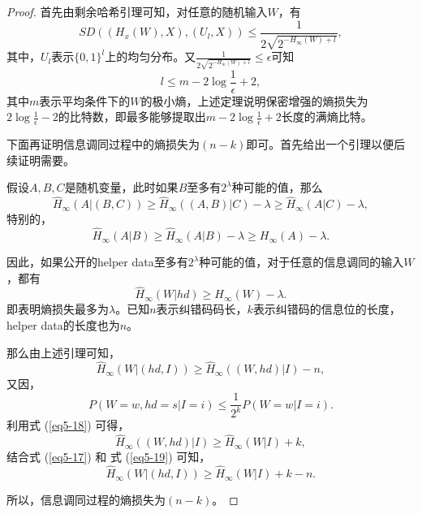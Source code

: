 \begin{proof}
	首先由剩余哈希引理可知，对任意的随机输入$W$，有
	\begin{equation}
		SD((H_x(W),X),(U_l,X)) \leq \frac{1}{2\sqrt{2^{-H_{\infty}(W)+l}}},
		\label{eq5-12}
	\end{equation}
	其中，$U_l$表示$\{0,1\}^l$上的均匀分布。又$\frac{1}{2\sqrt{2^{-H_{\infty}(W)+l}}} \leq \epsilon$可知
	\begin{equation}
		l\leq m-2\log\frac{1}{\epsilon}+2,
		\label{eq5-13}
	\end{equation}
	其中$m$表示平均条件下的$W$的极小熵，上述定理说明保密增强的熵损失为$2\log \frac{1}{\epsilon}-2$的比特数，即最多能够提取出$m-2\log \frac{1}{\epsilon}+2$长度的满熵比特。
	
	下面再证明信息调同过程中的熵损失为$(n-k)$即可。首先给出一个引理以便后续证明需要。
	\begin{lemma}
		假设$A,B,C$是随机变量，此时如果$B$至多有$2^{\lambda}$种可能的值，那么
		\begin{equation}
			\hat{H}_{\infty}(A|(B,C))\geq \hat{H}_{\infty}((A,B)|C)-\lambda \geq \hat{H}_{\infty}(A|C)-\lambda,
			\label{eq5-14}
		\end{equation}
		特别的，
		\begin{equation}
			\hat{H}_{\infty}(A|B)\geq \hat{H}_{\infty}(A|B)-\lambda \geq H_{\infty}(A)-\lambda.
			\label{eq5-15}
		\end{equation}
	\end{lemma}
	
	因此，如果公开的helper data至多有$2^{\lambda}$种可能的值，对于任意的信息调同的输入$W$，都有
	\begin{equation}
		\hat{H}_{\infty}(W|hd)\geq  H_{\infty}(W)-\lambda.
		\label{eq5-16}
	\end{equation}
	即表明熵损失最多为$\lambda$。已知$n$表示纠错码码长，$k$表示纠错码的信息位的长度，helper data的长度也为$n$。
	
	那么由上述引理可知，
	\begin{equation}
		\hat{H}_{\infty}(W|(hd,I))\geq \hat{H}_{\infty}((W,hd)|I)-n,
		\label{eq5-17}
	\end{equation}
	又因，
	\begin{equation}
		P(W=w,hd=s|I=i)\leq \frac{1}{2^{k}}P(W=w|I=i).
		\label{eq5-18}
	\end{equation}
	利用式 (\ref{eq5-18}) 可得，
	\begin{equation}
		\hat{H}_{\infty}((W,hd)|I) \geq \hat{H}_{\infty}(W|I)+k,
		\label{eq5-19}
	\end{equation}
	结合式 (\ref{eq5-17}) 和 式 (\ref{eq5-19}) 可知，
	\begin{equation}
		\hat{H}_{\infty}(W|(hd,I))\geq \hat{H}_{\infty}(W|I)+k-n.
		\label{eq5-20}
	\end{equation}
	
	所以，信息调同过程的熵损失为$(n-k)$。
\end{proof}

